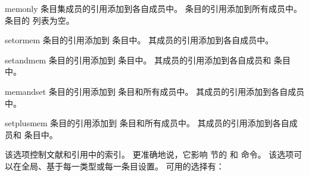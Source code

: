 \begin{optionlist}
\begin{valuelist}
\item[memonly] %
条目集成员的引用添加到各自成员中。
 条目的引用添加到所有成员中。
 条目的  列表为空。

\item[setormem] %
 条目的引用添加到  条目中。
其成员的引用添加到各自成员中。

\item[setandmem] %
 条目的引用添加到   条目中。
其成员的引用添加到各自成员和  条目中。

\item[memandset] %
 条目的引用添加到   条目和所有成员中。
其成员的引用添加到各自成员中。

\item[setplusmem] %
 条目的引用添加到   条目和所有成员中。
其成员的引用添加到各自成员和  条目中。

\end{valuelist}



该选项控制文献和引用中的索引。
更准确地说，它影响  节的  和  命令。
该选项可以在全局、基于每一类型或每一条目设置。
可用的选择有：


\end{optionlist}
